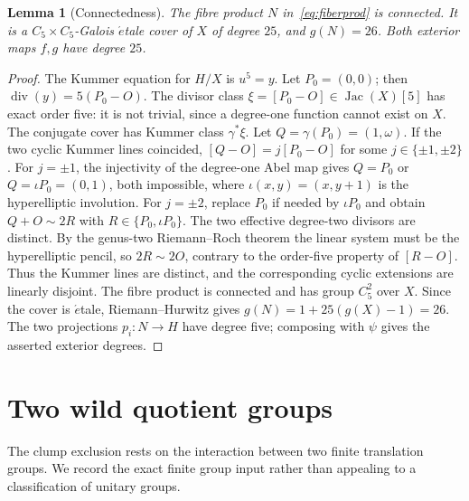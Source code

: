 \documentclass[11pt,a4paper,reqno]{amsart}
\newtheorem{lemma}[theorem]{Lemma}
\newcommand{\Jac}{\operatorname{Jac}}
\newcommand{\Div}{\operatorname{div}}
\begin{document}
\begin{lemma}[Connectedness]\label{lem:connected}
The fibre product $N$ in~\eqref{eq:fiberprod} is connected.  It is a
$C_5\times C_5$-Galois \(\acute{e}\)tale cover of $X$ of degree
$25$, and $g(N)=26$. Both exterior maps $f,g$ have degree $25$.
\end{lemma}
\begin{proof}
The Kummer equation for $H/X$ is $u^5=y$.  Let $P_0=(0,0)$;
then $\Div(y)=5(P_0-O)$. The divisor class
$\xi=[P_0-O]\in\Jac(X)[5]$ has exact order five: it is not
trivial, since a degree-one function cannot exist on $X$.
The conjugate cover has Kummer class $\gamma^*\xi$. Let
$Q=\gamma(P_0)=(1,\omega)$. If the two cyclic Kummer lines
coincided, $[Q-O]=j[P_0-O]$ for some
$j\in\{\pm1,\pm2\}$.
For $j=\pm1$, the injectivity of the degree-one Abel map gives
$Q=P_0$ or $Q=\iota P_0=(0,1)$, both impossible, where
$\iota(x,y)=(x,y+1)$ is the hyperelliptic involution.
For $j=\pm2$, replace $P_0$ if needed by $\iota P_0$ and obtain
$Q+O\sim2R$ with $R\in\{P_0,\iota P_0\}$.  The two effective
degree-two divisors are distinct. By the genus-two Riemann--Roch
theorem the linear system must be the hyperelliptic pencil, so
$2R\sim2O$, contrary to the order-five property of $[R-O]$.
Thus the Kummer lines are distinct, and the corresponding cyclic
extensions are linearly disjoint.  The fibre product is connected and
has group $C_5^2$ over $X$. Since the cover is \(\acute{e}\)tale,
Riemann--Hurwitz gives $g(N)=1+25(g(X)-1)=26$.
The two projections $p_i:N\to H$ have degree five; composing with
$\psi$ gives the asserted exterior degrees.
\end{proof}

\section{Two wild quotient groups}\label{sec:wild}
The clump exclusion rests on the interaction between two finite
translation groups. We record the exact finite group input rather than
appealing to a classification of unitary groups.
\end{document}
